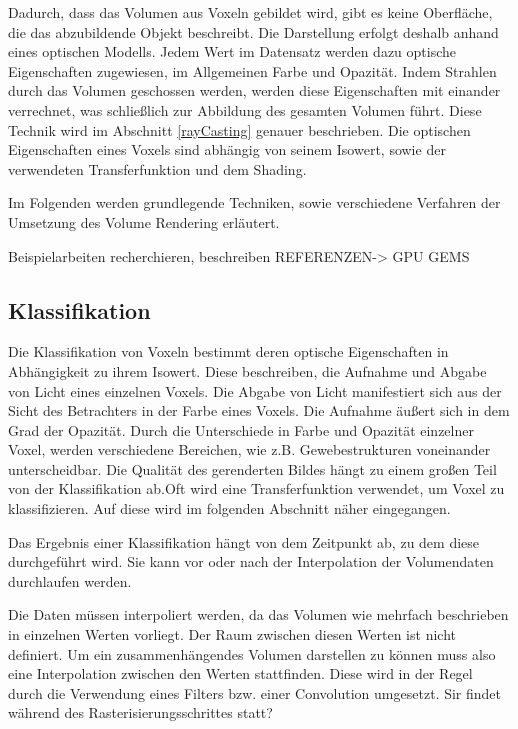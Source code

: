 Dadurch, dass das Volumen aus Voxeln gebildet wird, gibt es keine Oberfläche, die das abzubildende Objekt beschreibt. Die Darstellung erfolgt deshalb anhand eines optischen Modells. Jedem Wert im Datensatz werden dazu optische Eigenschaften zugewiesen, im Allgemeinen Farbe und Opazität. Indem Strahlen durch das Volumen geschossen werden, werden diese Eigenschaften mit einander verrechnet, was schließlich zur Abbildung des gesamten Volumen führt. Diese Technik wird im Abschnitt \ref{rayCasting} genauer beschrieben.
Die optischen Eigenschaften eines Voxels sind abhängig von seinem Isowert, sowie der verwendeten Transferfunktion und dem Shading. 

Im Folgenden werden grundlegende Techniken, sowie verschiedene Verfahren der Umsetzung des Volume Rendering erläutert.

\cite{Kaufman03}
\cite{kniss02}
Beispielarbeiten recherchieren, beschreiben
REFERENZEN-> GPU GEMS

\subsection{Klassifikation}

Die Klassifikation von Voxeln bestimmt deren optische Eigenschaften in Abhängigkeit zu ihrem Isowert. Diese beschreiben, die Aufnahme und Abgabe von Licht eines einzelnen Voxels. Die Abgabe von Licht manifestiert sich aus der Sicht des Betrachters in der Farbe eines Voxels. Die Aufnahme äußert sich in dem Grad der Opazität. Durch die Unterschiede in Farbe und Opazität einzelner Voxel, werden verschiedene Bereichen, wie z.B. Gewebestrukturen voneinander unterscheidbar. Die Qualität des gerenderten Bildes hängt zu einem großen Teil von der Klassifikation ab.Oft wird eine Transferfunktion verwendet, um Voxel zu klassifizieren. Auf diese wird im folgenden Abschnitt näher eingegangen. 

Das Ergebnis einer Klassifikation hängt von dem Zeitpunkt ab, zu dem diese durchgeführt wird. Sie kann vor oder nach der Interpolation der Volumendaten durchlaufen werden.

Die Daten müssen interpoliert werden, da das Volumen wie mehrfach beschrieben in einzelnen Werten vorliegt. Der Raum zwischen diesen Werten ist nicht definiert. Um ein zusammenhängendes Volumen darstellen zu können muss also eine Interpolation zwischen den Werten stattfinden. Diese wird in der Regel durch die Verwendung eines Filters bzw. einer Convolution umgesetzt. Sir findet während des Rasterisierungsschrittes statt?

